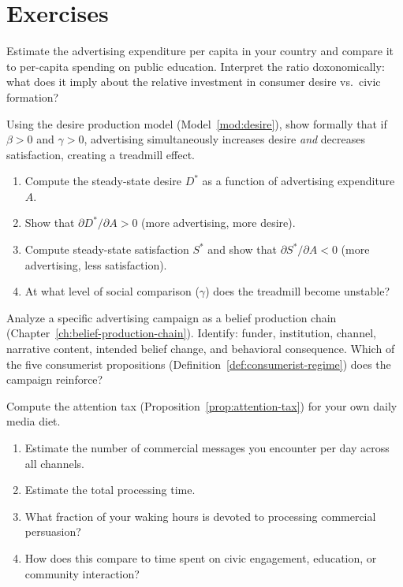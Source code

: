 \section{Exercises}

\begin{exercise}
Estimate the advertising expenditure per capita in your country and compare it to per-capita spending on public education.
Interpret the ratio doxonomically: what does it imply about the relative investment in consumer desire vs.\ civic formation?
\end{exercise}

\begin{exercise}
Using the desire production model (Model~\ref{mod:desire}), show formally that if $\beta > 0$ and $\gamma > 0$, advertising simultaneously increases desire \emph{and} decreases satisfaction, creating a treadmill effect.
\begin{enumerate}[nosep]
  \item Compute the steady-state desire $D^*$ as a function of advertising expenditure $A$.
  \item Show that $\partial D^* / \partial A > 0$ (more advertising, more desire).
  \item Compute steady-state satisfaction $S^*$ and show that $\partial S^* / \partial A < 0$ (more advertising, less satisfaction).
  \item At what level of social comparison ($\gamma$) does the treadmill become unstable?
\end{enumerate}
\end{exercise}

\begin{exercise}
Analyze a specific advertising campaign as a belief production chain (Chapter~\ref{ch:belief-production-chain}).
Identify: funder, institution, channel, narrative content, intended belief change, and behavioral consequence.
Which of the five consumerist propositions (Definition~\ref{def:consumerist-regime}) does the campaign reinforce?
\end{exercise}

\begin{exercise}
Compute the attention tax (Proposition~\ref{prop:attention-tax}) for your own daily media diet.
\begin{enumerate}[nosep]
  \item Estimate the number of commercial messages you encounter per day across all channels.
  \item Estimate the total processing time.
  \item What fraction of your waking hours is devoted to processing commercial persuasion?
  \item How does this compare to time spent on civic engagement, education, or community interaction?
\end{enumerate}
\end{exercise}

